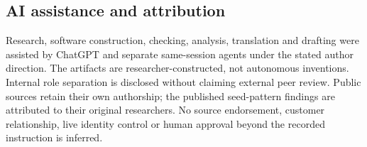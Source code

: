 \documentclass[11pt]{article}
\begin{document}
\subsection*{AI assistance and attribution}
Research, software construction, checking, analysis, translation and drafting were assisted by ChatGPT and separate same-session agents under the stated author direction. The artifacts are researcher-constructed, not autonomous inventions. Internal role separation is disclosed without claiming external peer review. Public sources retain their own authorship; the published seed-pattern findings are attributed to their original researchers. No source endorsement, customer relationship, live identity control or human approval beyond the recorded instruction is inferred.


\end{document}
